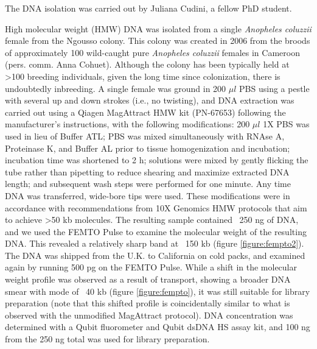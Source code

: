The DNA isolation was carried out by Juliana Cudini, a fellow PhD student. \\

\par{
High molecular weight (HMW) DNA was isolated from a single \textit{Anopheles coluzzii} female from the Ngousso colony. This colony was created in 2006 from the broods of approximately 100 wild-caught pure \textit{Anopheles coluzzii} females in Cameroon (pers. comm. Anna Cohuet). Although the colony has been typically held at >100 breeding individuals, given the long time since colonization, there is undoubtedly inbreeding. A single female was ground in 200 $\mu l$ PBS using a pestle with several up and down strokes (i.e., no twisting), and DNA extraction was carried out using a Qiagen MagAttract HMW kit (PN-67653) following the manufacturer's instructions, with the following modifications: 200 $\mu l$ 1X PBS was used in lieu of Buffer ATL; PBS was mixed simultaneously with RNAse A, Proteinase K, and Buffer AL prior to tissue homogenization and incubation; incubation time was shortened to 2 h; solutions were mixed by gently flicking the tube rather than pipetting to reduce shearing and maximize extracted DNA length; and subsequent wash steps were performed for one minute. Any time DNA was transferred, wide-bore tips were used. These modifications were in accordance with recommendations from 10X Genomics HMW protocols that aim to achieve >50 kb molecules. The resulting sample contained ~250 ng of DNA, and we used the FEMTO Pulse to examine the molecular weight of the resulting DNA. This revealed a relatively sharp band at ~150 kb (figure \ref{figure:fempto2}). The DNA was shipped from the U.K. to California on cold packs, and examined again by running 500 pg on the FEMTO Pulse. While a shift in the molecular weight profile was observed as a result of transport, showing a broader DNA smear with mode of ~40 kb (figure \ref{figure:fempto}), it was still suitable for library preparation (note that this shifted profile is coincidentally similar to what is observed with the unmodified MagAttract protocol). DNA concentration was determined with a Qubit fluorometer and Qubit dsDNA HS assay kit, and 100 ng from the 250 ng total was used for library preparation.
}


